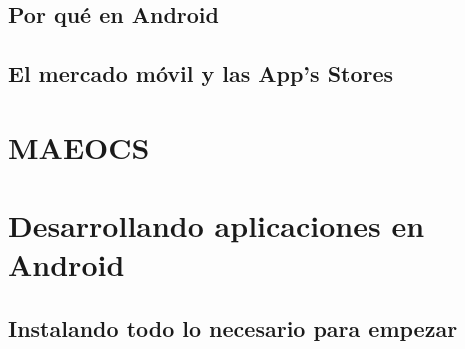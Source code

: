 \documentclass[letterpaper,12pt,dvips]{book}
\newcommand{\fnz}{\footnotesize}
\newcounter{ejemplo}
\begin{document}
\begin{mainmatter}
\setcounter{ejemplo}{0}
\chapter{Por qué en Android}




\setcounter{ejemplo}{0}
 \chapter{El mercado móvil y las App's Stores}



\part{MAEOCS}



\part{Desarrollando aplicaciones en Android}


\chapter{Instalando todo lo necesario para empezar}\label{cap:actividad}



\end{mainmatter}
\end{document}
